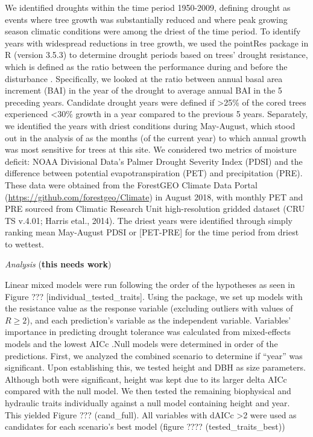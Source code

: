 \documentclass[]{article}
\begin{document}
We identified droughts within the time period 1950-2009, defining
drought \citep{slette_how_2019} as events where tree growth was
substantially reduced and where peak growing season climatic conditions
were among the driest of the time period. To identify years with
widespread reductions in tree growth, we used the pointRes package
\citep{R-pointRes} in R (version 3.5.3) to determine drought periods
based on trees' drought resistance, which is defined as the ratio
between the performance during and before the disturbance
\citep{lloret_components_2011}. Specifically, we looked at the ratio
between annual basal area increment (BAI) in the year of the drought to
average annual BAI in the 5 preceding years. Candidate drought years
were defined if \textgreater{}25\% of the cored trees experienced
\textless{}30\% growth in a year compared to the previous 5 years.
Separately, we identified the years with driest conditions during
May-August, which stood out in the analysis of
\citep{helcoski_growing_2019} as the months (of the current year) to
which annual growth was most sensitive for trees at this site. We
considered two metrics of moisture deficit: NOAA Divisional Data's
Palmer Drought Severity Index (PDSI) and the difference between
potential evapotranspiration (PET) and precipitation (PRE). These data
were obtained from the ForestGEO Climate Data Portal
(\url{https://github.com/forestgeo/Climate}) in August 2018, with
monthly PET and PRE sourced from Climatic Research Unit high-resolution
gridded dataset (CRU TS v.4.01; Harris etal., 2014). The driest years
were identified through simply ranking mean May-August PDSI or
{[}PET-PRE{]} for the time period from driest to wettest.

\emph{Analysis} (\textbf{this needs work})

Linear mixed models were run following the order of the hypotheses as
seen in Figure ??? {[}individual\_tested\_traits{]}. Using the
\citep{R-pointRes} package, we set up models with the resistance value
as the response variable (excluding outliers with values of \(R\ge 2\)),
and each prediction's variable as the independent variable. Variables'
importance in predicting drought tolerance was calculated from
mixed-effects models and the lowest AICc
\citep[\citet{R-AICcmodavg}]{R-lme4}.Null models were determined in
order of the predictions. First, we analyzed the combined scenario to
determine if ``year'' was significant. Upon establishing this, we tested
height and DBH as size parameters. Although both were significant,
height was kept due to its larger delta AICc compared with the null
model. We then tested the remaining biophysical and hydraulic traits
individually against a null model containing height and year. This
yielded Figure ??? (cand\_full). All variables with dAICc
\textgreater{}2 were used as candidates for each scenario's best model
(figure ???? (tested\_traits\_best))
\end{document}
